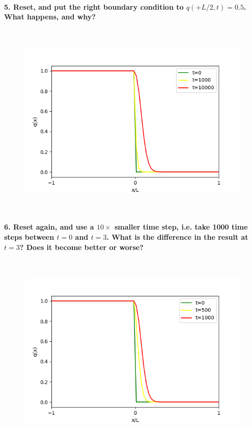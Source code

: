 \paragraph{5. Reset, and put the right boundary condition 
    to $q(+L/2,t)=0.5$. What happens, and why?
} \ \\
    \begin{figure}[h!]
        \centering
        \includegraphics[width=.6\textwidth]{../figures/upwind_5.png}
        \caption{}
    \end{figure} \ \\ 

\paragraph{6. Reset again, and use a $10\times$ smaller 
    time step, i.e. take 1000 time steps between $t=0$ and 
    $t=3$. What is the difference in the result at $t=3$? 
    Does it become better or worse?
} \ \\
    \begin{figure}[h!]
        \centering
        \includegraphics[width=.6\textwidth]{../figures/upwind_6.png}
        \caption{}
    \end{figure} \ \\ 

